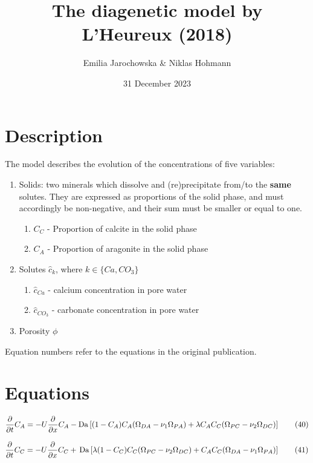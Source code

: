 \documentclass[10pt, letterpaper]{article}
\title{The diagenetic model by L'Heureux (2018)}
\author{Emilia Jarochowska & Niklas Hohmann}
\date{31 December 2023}
\begin{document}
\maketitle

\section{Description}
The model describes the evolution of the concentrations of five variables:
\begin{enumerate}
    \item Solids: two minerals which dissolve and (re)precipitate from/to the \textbf{same} solutes. They are expressed as proportions of the solid phase, and must accordingly be non-negative, and their sum must be smaller or equal to one. 
    \begin{enumerate}
        \item $C_C$ - Proportion of calcite in the solid phase
        \item $C_A$ - Proportion of aragonite in the solid phase 
    \end{enumerate}
    \item Solutes $\hat{c}_k$, where $k \in \{Ca, CO_{3}\}$
    \begin{enumerate}
        \item $\hat c_{Ca}$ - calcium concentration in pore water
        \item $ \hat c_{CO_{3}}$ - carbonate concentration in pore water
    \end{enumerate}
    \item Porosity $\phi$
\end{enumerate}
Equation numbers refer to the equations in the original publication.

\section{Equations}
\begin{equation}
\frac{\partial}{\partial t} C_A = -U\frac{\partial}{\partial x} C_A - \operatorname{Da}\left[(1 - C_A)C_A (\Omega_{DA} - \nu_1 \Omega_{PA}) \\
        + \lambda C_A C_C (\Omega_{PC} - \nu_2 \Omega_{DC})\right] \tag{40}
\end{equation}

\begin{equation}
\frac{\partial}{\partial t} C_C = -U\frac{\partial}{\partial x} C_C + \\\operatorname{Da}\left[\lambda(1-C_C)C_C(\Omega_{PC} - \nu_2 \Omega_{DC}) + C_A C_C (\Omega_{DA} - \nu_1 \Omega_{PA})\right] \tag{41}
\end{equation}
\end{document}
